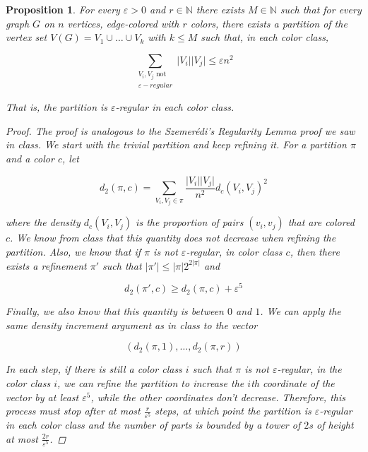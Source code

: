 \documentclass{amsart}
\theoremstyle{plain}
\newtheorem*{proposition}{\textbf{Proposition}}
\theoremstyle{definition}
\newcommand{\N}{\mathbb{N}}
\begin{document}
    \begin{proposition}
        For every $\varepsilon > 0$ and $r \in \N$ there exists $M \in \N$ such that
        for every graph $G$ on $n$ vertices, edge-colored with $r$ colors, there exists a partition of the vertex set
        $V(G) = V_1 \cup \ldots \cup V_k$ with $k \leq M$ such that, in each color class,

        \[
             \sum_{\substack{V_i, V_j \text{ not } \\ \varepsilon-regular}} \lvert V_i \rvert \lvert V_j \rvert \leq \varepsilon n^2
        \]

        That is, the partition is $\varepsilon$-regular in each color class.

        \begin{proof}
            The proof is analogous to the Szemerédi's Regularity Lemma proof we saw in class.
            We start with the trivial partition and keep refining it.
            For a partition $\pi$ and a color $c$, let

            \[
                d_2(\pi, c) = \sum_{V_i, V_j \in \pi} \frac{\lvert V_i \rvert \lvert V_j \rvert}{n^2} d_c(V_i, V_j)^2
            \]

            where the density $d_c(V_i, V_j)$ is the proportion of pairs $(v_i, v_j)$ that are colored $c$.
            We know from class that this quantity does not decrease when refining the partition.
            Also, we know that if $\pi$ is not $\varepsilon$-regular, in color class $c$, then there exists
            a refinement $\pi'$ such that $\lvert \pi' \rvert \leq \lvert \pi \rvert 2^{2 \lvert \pi \rvert}$ and

            \[
                d_2(\pi', c) \geq d_2(\pi, c) + \varepsilon^5
            \]

            Finally, we also know that this quantity is between $0$ and $1$.
            We can apply the same density increment argument as in class to the vector

            \[
                \left( d_2(\pi, 1), \ldots, d_2(\pi, r) \right)
            \]

            In each step, if there is still a color class $i$ such that $\pi$ is not $\varepsilon$-regular,
            in the color class $i$, we can refine the partition to increase the $i$th coordinate of the vector
            by at least $\varepsilon^5$, while the other coordinates don't decrease.
            Therefore, this process
            must stop after at most $\frac{r}{\varepsilon^5}$ steps,
            at which point the partition is $\varepsilon$-regular in each color class
            and the number of parts is bounded by a tower of $2$s of height at most $\frac{2r}{\varepsilon^5}$. \qedhere

        \end{proof}
    \end{proposition}
\end{document}
